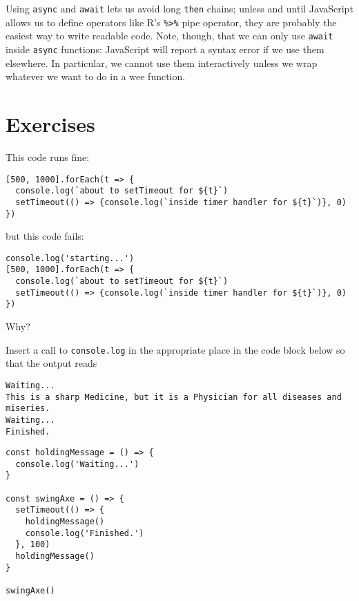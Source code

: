 Using \texttt{async} and \texttt{await} lets us avoid long \texttt{then} chains;
unless and until JavaScript allows us to define operators like R's \texttt{\%\textgreater{}\%} pipe operator,
they are probably the easiest way to write readable code.
Note,
though,
that we can only use \texttt{await} inside \texttt{async} functions:
JavaScript will report a syntax error if we use them elsewhere.
In particular,
we cannot use them interactively unless we wrap whatever we want to do in a wee function.

\section{Exercises}\label{s:promises-exercises}


This code runs fine:

\begin{verbatim}
[500, 1000].forEach(t => {
  console.log(`about to setTimeout for ${t}`)
  setTimeout(() => {console.log(`inside timer handler for ${t}`)}, 0)
})
\end{verbatim}

\noindent
but this code fails:

\begin{verbatim}
console.log('starting...')
[500, 1000].forEach(t => {
  console.log(`about to setTimeout for ${t}`)
  setTimeout(() => {console.log(`inside timer handler for ${t}`)}, 0)
})
\end{verbatim}

Why?


Insert a call to \texttt{console.log} in the appropriate place in the code block below
so that the output reads

\begin{verbatim}
Waiting...
This is a sharp Medicine, but it is a Physician for all diseases and miseries.
Waiting...
Finished.
\end{verbatim}

\begin{verbatim}
const holdingMessage = () => {
  console.log('Waiting...')
}

const swingAxe = () => {
  setTimeout(() => {
    holdingMessage()
    console.log('Finished.')
  }, 100)
  holdingMessage()
}

swingAxe()
\end{verbatim}


